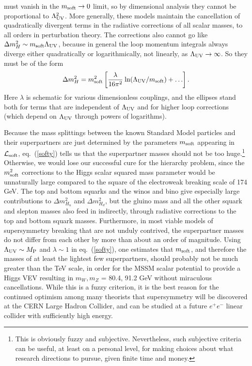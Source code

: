 \documentclass[12pt]{article}
\def\beq{\begin{eqnarray}}
\def\eeq{\end{eqnarray}}
\def\lagr{{\cal L}}
\def\MPlanck{M_{\rm P}}
\begin{document}
must vanish in the $m_{\rm soft}\rightarrow 0$ limit, so by dimensional
analysis they cannot be proportional to $\Lambda_{\rm UV}^2$. More
generally, these models maintain the cancellation of quadratically
divergent terms in the radiative corrections of all scalar masses, to all
orders in perturbation theory. The corrections also cannot go like $\Delta
m_H^2 \sim m_{\rm soft} \Lambda_{\rm UV}$, because in general the loop
momentum integrals always diverge either quadratically or logarithmically,
not linearly, as $\Lambda_{\rm UV} \rightarrow \infty$. So they must be of
the form
\beq
\Delta m_{H}^2 =
m_{\rm soft}^2
\left [{\lambda\over 16 \pi^2}\> {\rm ln}(\Lambda_{\rm UV}/m_{\rm soft})
+ \ldots \right ].
\label{softy}
\eeq
Here $\lambda$ is schematic for various dimensionless couplings, and the
ellipses stand both for terms that are independent of $\Lambda_{\rm UV}$
and for higher loop corrections (which depend on $\Lambda_{\rm UV}$
through powers of logarithms). 

Because the mass splittings between the known Standard Model particles and
their superpartners are just determined by the parameters $m_{\rm soft}$
appearing in $\lagr_{\rm soft}$, eq.~(\ref{softy}) tells us that the
superpartner masses should not be too huge.\footnote{This is 
obviously fuzzy and subjective. Nevertheless, such subjective criteria can be useful,
at least on a personal level, for making choices about 
what research directions to pursue, given finite time and money.} 
Otherwise, we would lose our
successful cure for the hierarchy problem, since the $m_{\rm soft}^2$
corrections to the Higgs scalar squared mass parameter would be
unnaturally large compared to the square of the electroweak breaking scale
of 174 GeV. The top and bottom squarks and the winos and bino give
especially large contributions to $\Delta m_{H_u}^2$ and $\Delta
m_{H_d}^2$, but the gluino mass and all the other squark and slepton
masses also feed in indirectly, through radiative corrections to the top
and bottom squark masses. Furthermore, in most viable models of
supersymmetry breaking that are not unduly contrived, the superpartner
masses do not differ from each other by more than about an order of
magnitude. Using $\Lambda_{\rm UV} \sim \MPlanck$ and $\lambda \sim 1$ in
eq.~(\ref{softy}), one estimates that $m_{\rm soft}$, and therefore the masses
of at least the lightest few superpartners, should probably not be much 
greater than the TeV scale, in order for the MSSM scalar potential 
to provide a Higgs VEV resulting in $m_W,m_Z$ = 80.4, 91.2 GeV without 
miraculous cancellations. While this is a fuzzy criterion, it
is the best reason for the continued optimism among many theorists that
supersymmetry will be discovered at the CERN
Large Hadron Collider, and can be studied at a future $e^+ e^-$ linear
collider with sufficiently high energy. 
\end{document}
